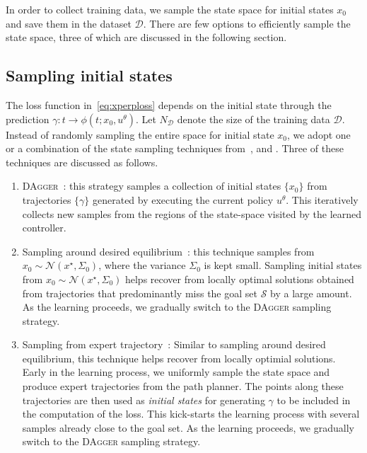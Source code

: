 In order to collect training data, we sample the state space for initial states
$x_0$ and save them in the dataset $\mathcal{D}$. There are few options to
efficiently sample the state space, three of which are discussed in the
following section.

\subsection{Sampling initial states}
\label{ssec:state_sampling}

The loss function in~\eqref{eq:xperploss} depends on the initial state
through the prediction $\gamma : t \to \phi(t; x_0, u^\theta)$. 
%
Let $N_\mathcal{D}$ denote the size of the training data $\mathcal{D}$. 
%
Instead of randomly sampling the entire space for initial state $x_0$, we adopt
one or a combination of the state sampling techniques from~\cite{neuralpbc},
\cite{datadriven_ESC} and \cite{DBLP:journals/corr/abs-1011-0686}. Three of
these techniques are discussed as follows.
%
\begin{enumerate}
    \item \textsc{DAgger}~\cite{DBLP:journals/corr/abs-1011-0686}: this strategy
    samples a collection of initial states $\{x_0\}$ from trajectories
    $\{\gamma\}$ generated by executing the current policy $u^\theta$. This
    iteratively collects new samples from the regions of the state-space visited
    by the learned controller. 
    \item Sampling around desired equilibrium~\cite{neuralpbc}: this technique samples from $x_0
    \sim \mathcal{N} \left(x^\star, \Sigma_0\right)$, where the variance $\Sigma_0$
    is kept small. Sampling initial states from $x_0 \sim \mathcal{N}
    \left(x^\star, \Sigma_0\right)$ helps recover from locally optimal solutions
    obtained from trajectories that predominantly miss the goal set
    $\mathcal{S}$ by a large amount. As the learning proceeds, we gradually
    switch to the \textsc{DAgger} sampling strategy. 
    \item Sampling from expert trajectory~\cite{datadriven_ESC}:  
    Similar to sampling around desired equilibrium, this technique helps recover
    from locally optimial solutions. Early in the learning process, we uniformly
    sample the state space and produce expert trajectories from the path
    planner. The points along these trajectories are then used as
    \textit{initial states} for generating $\gamma$ to be included in the
    computation of the loss. This kick-starts the learning process with several
    samples already close to the goal set. As the learning proceeds, we
    gradually switch to the \textsc{DAgger} sampling strategy. 
\end{enumerate}


